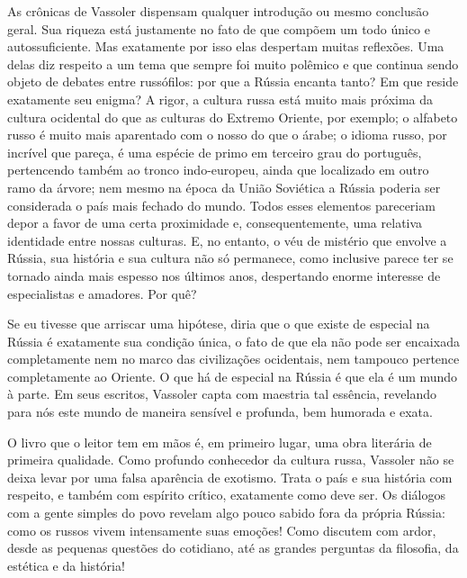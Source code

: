 As crônicas de Vassoler dispensam qualquer introdução ou mesmo conclusão
geral. Sua riqueza está justamente no fato de que compõem um todo único
e autossuficiente. Mas exatamente por isso elas despertam muitas
reflexões. Uma delas diz respeito a um tema que sempre foi muito
polêmico e que continua sendo objeto de debates entre russófilos: por
que a Rússia encanta tanto? Em que reside exatamente seu enigma? A
rigor, a cultura russa está muito mais próxima da cultura ocidental do
que as culturas do Extremo Oriente, por exemplo; o alfabeto russo é
muito mais aparentado com o nosso do que o árabe; o idioma russo, por
incrível que pareça, é uma espécie de primo em terceiro grau do
português, pertencendo também ao tronco indo-europeu, ainda que
localizado em outro ramo da árvore; nem mesmo na época da União
Soviética a Rússia poderia ser considerada o país mais fechado do mundo.
Todos esses elementos pareceriam depor a favor de uma certa proximidade
e, consequentemente, uma relativa identidade entre nossas culturas. E,
no entanto, o véu de mistério que envolve a Rússia, sua história e sua
cultura não só permanece, como inclusive parece ter se tornado ainda
mais espesso nos últimos anos, despertando enorme interesse de
especialistas e amadores. Por quê?

Se eu tivesse que arriscar uma hipótese, diria que o que existe de
especial na Rússia é exatamente sua condição única, o fato de que ela
não pode ser encaixada completamente nem no marco das civilizações
ocidentais, nem tampouco pertence completamente ao Oriente. O que há de
especial na Rússia é que ela é um mundo à parte. Em seus escritos,
Vassoler capta com maestria tal essência, revelando para nós este mundo
de maneira sensível e profunda, bem humorada e exata.

O livro que o leitor tem em mãos é, em primeiro lugar, uma obra
literária de primeira qualidade. Como profundo conhecedor da cultura
russa, Vassoler não se deixa levar por uma falsa aparência de exotismo.
Trata o país e sua história com respeito, e também com espírito crítico,
exatamente como deve ser. Os diálogos com a gente simples do povo
revelam algo pouco sabido fora da própria Rússia: como os russos vivem
intensamente suas emoções! Como discutem com ardor, desde as pequenas
questões do cotidiano, até as grandes perguntas da filosofia, da
estética e da história!


